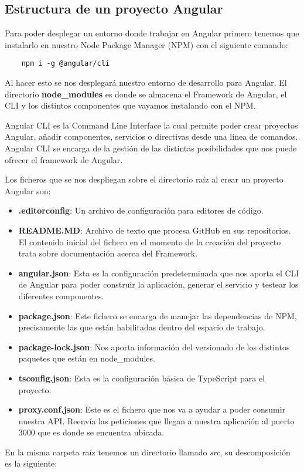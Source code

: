\subsection{Estructura de un proyecto Angular}
Para poder desplegar un entorno donde trabajar en Angular primero tenemos que instalarlo en nuestro Node Package Manager (NPM) con el siguiente comando:
\begin{verbatim}
    npm i -g @angular/cli
\end{verbatim}
Al hacer esto se nos desplegará nuestro entorno de desarrollo para Angular. El directorio \textbf{node\_modules} es donde se almacena el Framework de Angular, el CLI y los distintos componentes que vayamos instalando con el NPM.
\begin{tcolorbox}
    [colback=green!5!white,colframe=green!75!black,fonttitle=\bfseries,title=¿Qué diferencias hay entre Angular CLI y Angular Framework?]
    Angular CLI es la Command Line Interface la cual permite poder crear proyectos Angular, añadir componentes, servicios o directivas desde una línea de comandos. Angular CLI se encarga de la gestión de las distintas posibilidades que nos puede ofrecer el framework de Angular.
\end{tcolorbox}
Los ficheros que se nos despliegan sobre el directorio raíz al crear un proyecto Angular son:
\begin{itemize}
    \item \textbf{.editorconfig}: Un archivo de configuración para editores de código.
    \item \textbf{README.MD}: Archivo de texto que procesa GitHub en sus repositorios. El contenido inicial del fichero en el momento de la creación del proyecto trata sobre documentación acerca del Framework.
    \item \textbf{angular.json}: Esta es la configuración predeterminada que nos aporta el CLI de Angular para poder construir la aplicación, generar el servicio y testear los diferentes componentes.
    \item \textbf{package.json}: Este fichero se encarga de manejar las dependencias de NPM, precisamente las que están habilitadas dentro del espacio de trabajo.
    \item \textbf{package-lock.json}: Nos aporta información del versionado de los distintos paquetes que están en node\_modules.
    \item \textbf{tsconfig.json}: Esta es la configuración básica de TypeScript para el proyecto.
    \item \textbf{proxy.conf.json}: Este es el fichero que nos va a ayudar a poder consumir nuestra API. Reenvía las peticiones que llegan a nuestra aplicación al puerto 3000 que es donde se encuentra ubicada.
\end{itemize}
En la misma carpeta raíz tenemos un directorio llamado \textit{src}, su descomposición es la siguiente:

